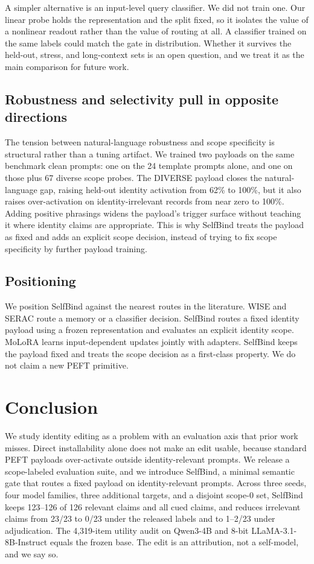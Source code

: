 \documentclass[11pt]{article}
\begin{document}
A simpler alternative is an input-level query classifier. We did not train one. Our linear probe holds the representation and the split fixed, so it isolates the value of a nonlinear readout rather than the value of routing at all. A classifier trained on the same labels could match the gate in distribution. Whether it survives the held-out, stress, and long-context sets is an open question, and we treat it as the main comparison for future work.


\subsection{Robustness and selectivity pull in opposite directions}
The tension between natural-language robustness and scope specificity is structural rather than a tuning artifact. We trained two payloads on the same benchmark clean prompts: one on the 24 template prompts alone, and one on those plus 67 diverse scope probes. The DIVERSE payload closes the natural-language gap, raising held-out identity activation from 62\% to 100\%, but it also raises over-activation on identity-irrelevant records from near zero to 100\%. Adding positive phrasings widens the payload's trigger surface without teaching it where identity claims are appropriate. This is why SelfBind treats the payload as fixed and adds an explicit scope decision, instead of trying to fix scope specificity by further payload training.

\subsection{Positioning}
We position SelfBind against the nearest routes in the literature. WISE and SERAC route a memory or a classifier decision. SelfBind routes a fixed identity payload using a frozen representation and evaluates an explicit identity scope. MoLoRA learns input-dependent updates jointly with adapters. SelfBind keeps the payload fixed and treats the scope decision as a first-class property. We do not claim a new PEFT primitive.

\section{Conclusion}

We study identity editing as a problem with an evaluation axis that prior work misses. Direct installability alone does not make an edit usable, because standard PEFT payloads over-activate outside identity-relevant prompts. We release a scope-labeled evaluation suite, and we introduce SelfBind, a minimal semantic gate that routes a fixed payload on identity-relevant prompts. Across three seeds, four model families, three additional targets, and a disjoint scope-0 set, SelfBind keeps 123--126 of 126 relevant claims and all cued claims, and reduces irrelevant claims from 23/23 to 0/23 under the released labels and to 1--2/23 under adjudication. The 4,319-item utility audit on Qwen3-4B and 8-bit LLaMA-3.1-8B-Instruct equals the frozen base. The edit is an attribution, not a self-model, and we say so.
\end{document}
